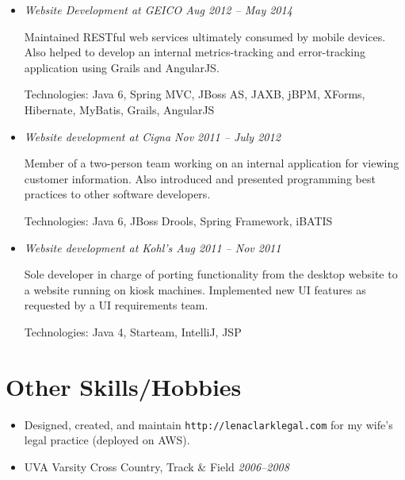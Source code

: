 \documentclass[a4paper,11pt]{article}
\begin{document}
  \vskip 5pt
  \begin{itemize}

    \item \textit{Website Development at GEICO \hfill Aug 2012 -- May 2014}

      Maintained RESTful web services ultimately consumed by mobile devices. Also helped to develop
      an internal metrics-tracking and error-tracking application using Grails and AngularJS.

      Technologies: Java 6, Spring MVC, JBoss AS, JAXB, jBPM, XForms, Hibernate, MyBatis, Grails,
      AngularJS

%

    \item \textit{Website development at Cigna \hfill Nov 2011 -- July 2012}

      Member of a two-person team working on an internal application for viewing customer
      information. Also introduced and presented programming best practices to other software
      developers.

      Technologies: Java 6, JBoss Drools, Spring Framework, iBATIS

    \item \textit{Website development at Kohl's \hfill Aug 2011 -- Nov 2011}

      Sole developer in charge of porting functionality from the desktop website to a website
      running on kiosk machines. Implemented new UI features as requested by a UI requirements team.

      Technologies: Java 4, Starteam, IntelliJ, JSP

  \end{itemize}



\vskip 4pt
\section*{Other Skills/Hobbies}
\vskip 5pt

  \begin{itemize}
    \item Designed, created, and maintain \texttt{http://lenaclarklegal.com} for my wife's legal
      practice (deployed on AWS).
    \item UVA Varsity Cross Country, Track \& Field \hfill \textit{2006--2008}
  \end{itemize}
\end{document}
